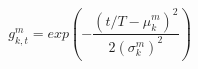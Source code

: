 \begin{equation}
\label{eq:gaussian-mask}
{g}_{k,t}^{m}=exp\left( -\frac{{\left( t/T-{\mu }_{k}^{m}\right) }^{2}}{2{\left( {\sigma }_{k}^{m}\right) }^{2}}\right) 
\end{equation}
